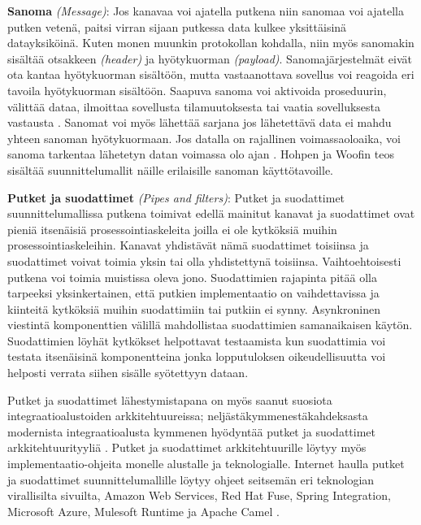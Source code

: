    \textbf{Sanoma} \textit{(Message)}:
      Jos kanavaa voi ajatella putkena niin sanomaa voi ajatella putken vetenä, paitsi virran sijaan putkessa data kulkee yksittäisinä datayksiköinä. Kuten monen muunkin protokollan kohdalla, niin myös sanomakin sisältää otsakkeen \textit{(header)} ja  hyötykuorman \textit{(payload)}. Sanomajärjestelmät eivät ota kantaa hyötykuorman sisältöön, mutta vastaanottava sovellus voi reagoida eri tavoila hyötykuorman sisältöön. Saapuva sanoma voi aktivoida proseduurin, välittää dataa, ilmoittaa sovellusta tilamuutoksesta tai vaatia sovelluksesta vastausta \citep{Hohpe2004}. Sanomat voi myös lähettää sarjana jos lähetettävä data ei mahdu yhteen sanoman hyötykuormaan. Jos datalla on rajallinen voimassaoloaika, voi sanoma tarkentaa lähetetyn datan voimassa olo ajan \citep{Hohpe2004}. Hohpen ja Woofin teos sisältää suunnittelumallit näille erilaisille sanoman käyttötavoille.

   \newpage
   \textbf{Putket ja suodattimet} \textit{(Pipes and filters)}:
      Putket ja suodattimet suunnittelumallissa putkena toimivat edellä mainitut kanavat ja suodattimet ovat pieniä itsenäisiä prosessointiaskeleita joilla ei ole kytköksiä muihin prosessointiaskeleihin. Kanavat yhdistävät nämä suodattimet toisiinsa ja suodattimet voivat toimia yksin tai olla yhdistettynä toisiinsa. Vaihtoehtoisesti putkena voi toimia muistissa oleva jono. Suodattimien rajapinta pitää olla tarpeeksi yksinkertainen, että putkien implementaatio on vaihdettavissa ja kiinteitä kytköksiä muihin suodattimiin tai putkiin ei synny.
      Asynkroninen viestintä komponenttien välillä mahdollistaa suodattimien samanaikaisen käytön.
   Suodattimien löyhät kytkökset helpottavat testaamista kun suodattimia voi testata itsenäisinä komponentteina jonka lopputuloksen oikeudellisuutta voi helposti verrata siihen sisälle syötettyyn dataan.


      Putket ja suodattimet lähestymistapana on myös saanut suosiota integraatioalustoiden arkkitehtuureissa; neljästäkymmenestäkahdeksasta modernista integraatioalusta kymmenen hyödyntää putket ja suodattimet arkkitehtuurityyliä \citep{Freire2019}. Putket ja suodattimet arkkitehtuurille löytyy myös implementaatio-ohjeita monelle alustalle ja teknologialle. Internet haulla putket ja suodattimet suunnittelumallille löytyy ohjeet seitsemän eri teknologian virallisilta sivuilta, Amazon Web Services, Red Hat Fuse, Spring Integration, Microsoft Azure, Mulesoft Runtime ja Apache Camel \citep{AWSPipes} \citep{RedHatJboss} \citep{SpringPipes} \citep{AzurePipeAndFilt} \citep{MulesoftPat} \citep{CamelPipes}.

